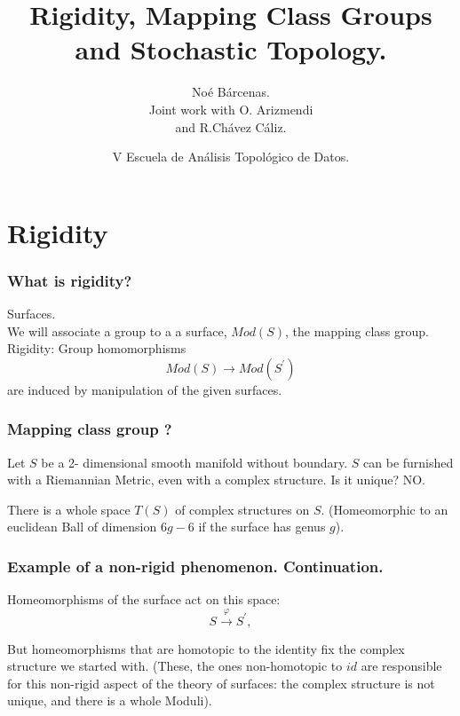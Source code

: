 \documentclass[handout]{beamer}
\title{Rigidity, Mapping  Class Groups  and Stochastic Topology. }
\author{No\'e B\'arcenas.\\ Joint work with O. Arizmendi \\  and R.Ch\'avez C\'aliz.}
\institute{Centro de  Ciencias Matem\'aticas. \\ UNAM. }
\date{V Escuela  de  An\'alisis Topol\'ogico  de  Datos.}
\theoremstyle{plain}
\begin{document}
\begin{frame}
\titlepage
\end{frame}



\section{Rigidity}

\begin{frame}
\frametitle{What  is  rigidity?}

Surfaces. \\

We  will  associate a  group  to  a  a  surface, $Mod(S)$,  the  mapping  class  group. \pause
Rigidity: Group  homomorphisms 
$$ Mod(S) \to Mod  (S^{'})$$
are  induced  by  manipulation  of  the  given surfaces. 
\end{frame}



\begin{frame}\frametitle{Mapping  class group ?}

Let  $S$  be  a 2- dimensional  smooth  manifold without  boundary. \pause
$S$  can  be  furnished  with  a Riemannian  Metric, even with  a  complex structure. \pause Is  it  unique? \pause
NO. \pause 


There  is  a  whole  space $T(S)$ of  complex  structures  on  $S$. \pause (Homeomorphic  to  an  euclidean Ball  of  dimension $6g-6$  if  the  surface  has  genus  $g$). \pause 

\end{frame}
\begin{frame}\frametitle{Example  of  a  non-rigid phenomenon. Continuation.}

Homeomorphisms  of  the  surface  act  on  this space: 
$$ S\overset{\varphi }{\to } S^{'}, $$ \pause 


But homeomorphisms  that  are homotopic   to the  identity fix  the  complex structure we  started with. \pause 
(These, the   ones non-homotopic  to $id$  are  responsible  for  this  non-rigid  aspect of  the  theory  of  surfaces: the  complex  structure  is  not  unique, and  there  is  a  whole  Moduli). 

\end{frame}
\end{document}
